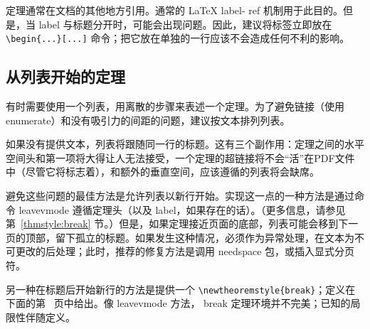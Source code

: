 \documentclass[11pt,twoside,fontset=sikou,punct=kaiming]{ctexart}
\newcommand{\ntt}{%
  \ttfamily\mdseries\upshape%
}
\DeclareRobustCommand{\cn}[1]{{\ntt\bslchar#1}}
\DeclareRobustCommand{\pkg}[1]{{\ntt#1}}
\DeclareRobustCommand{\env}[1]{{\ntt#1}}
\def\latex/{{\protect\LaTeX}}
\begin{document}
定理通常在文档的其他地方引用。通常的 \latex/ \cn{label}-\cn{ref} 机制用于此目的。但是，当 \cn{label} 与标题分开时，可能会出现问题。因此，建议将标签立即放在 \verb+\begin{...}[...]+ 命令；把它放在单独的一行应该不会造成任何不利的影响。

\subsection{从列表开始的定理}
\label{ThmWithList}

有时需要使用一个列表，用离散的步骤来表述一个定理。为了避免链接（使用 \env{enumerate}）和没有吸引力的间距的问题，建议按文本排列列表。

如果没有提供文本，列表将跟随同一行的标题。这有三个副作用：定理之间的水平空间头和第一项将大得让人无法接受，一个定理的超链接将不会“活”在PDF文件中（尽管它将标志着），和额外的垂直空间，应该遵循的列表将会缺席。

避免这些问题的最佳方法是允许列表以新行开始。实现这一点的一种方法是通过命令 \cn{leavevmode} 遵循定理头（以及 \cn{label}，如果存在的话）。（更多信息，请参见第~\ref{thmstyle:break} 节。）但是，如果定理接近页面的底部，列表可能会移到下一页的顶部，留下孤立的标题。如果发生这种情况，必须作为异常处理，在文本为不可更改的后处理；此时，推荐的修复方法是调用 \pkg{needspace} \cite{NDS} 包，或插入显式分页符。

另一种在标题后开始新行的方法是提供一个 \verb+\newtheoremstyle{break}+；定义在下面的第~\pageref{thmstyle:break} 页中给出。像 \cn{leavevmode} 方法，\env{break} 定理环境并不完美；已知的局限性伴随定义。



\end{document}
